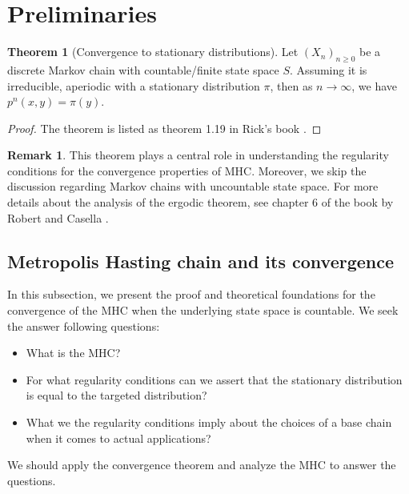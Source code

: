 \documentclass[]{article}
\theoremstyle{definition}
\newtheorem{theorem}{Theorem}       %
\newtheorem{remark}{Remark}[subsection]
{
    \newtheorem{assumption}{Assumption}
}
\begin{document}
\section{Preliminaries}\label{sec:preliminaries}
    \begin{theorem}[Convergence to stationary distributions]\label{thm:cvg_sta_distr}
        Let $(X_n)_{n\ge 0}$ be a discrete Markov chain with countable/finite state space $S$. Assuming it is irreducible, aperiodic with a stationary distribution $\pi$, then as $n\rightarrow \infty$, we have $p^n(x, y) = \pi(y)$. 
    \end{theorem}
    \begin{proof}
        The theorem is listed as theorem 1.19 in Rick's book \cite{book:rick_essential}. 
    \end{proof}
    \begin{remark}
        This theorem plays a central role in understanding the regularity conditions for the convergence properties of MHC. Moreover, we skip the discussion regarding Markov chains with uncountable state space. For more details about the analysis of the ergodic theorem, see chapter 6 of the book by Robert and Casella \cite{book:robert_casella_2005}. 
    \end{remark}
    \subsection{Metropolis Hasting chain and its convergence}
        In this subsection, we present the proof and theoretical foundations for the convergence of the MHC when the underlying state space is countable. We seek the answer following questions: 
        \begin{itemize}
            \item [1.] What is the MHC? 
            \item [2.] For what regularity conditions can we assert that the stationary distribution is equal to the targeted distribution? 
            \item [3.] What we the regularity conditions imply about the choices of a base chain when it comes to actual applications? 
        \end{itemize}
        We should apply the convergence theorem and analyze the MHC to answer the questions. 
\end{document}
